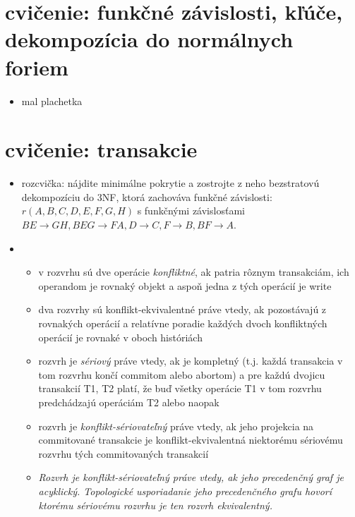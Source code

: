 \documentclass[10pt, a4paper]{article}
\begin{document}
\section{cvičenie: funkčné závislosti, kľúče, dekompozícia do normálnych foriem}

\begin{itemize}

\item mal plachetka
\end{itemize}

\newpage

\section{cvičenie: transakcie}

\begin{itemize}
\item rozcvička: nájdite minimálne pokrytie a zostrojte z neho bezstratovú dekompozíciu do 3NF, ktorá zachováva funkčné závislosti:\\
$r(A, B, C, D, E, F, G, H)$ s funkčnými závislosťami $BE\to GH, BEG\to FA, D\to C, F\to B, BF\to A$.

\item
\begin{itemize}
    \item v rozvrhu sú dve operácie \emph{konfliktné}, ak patria rôznym
    transakciám, ich operandom je rovnaký objekt a aspoň jedna z
    tých operácií je write

    \item dva rozvrhy sú konflikt-ekvivalentné práve vtedy, ak
    pozostávajú z rovnakých operácií a
    relatívne poradie každých dvoch konfliktných operácií je rovnaké
    v oboch históriách

    \item rozvrh je \emph{sériový} práve vtedy, ak je kompletný (t.j.
    každá transakcia v tom rozvrhu končí commitom alebo abortom) a
    pre každú dvojicu transakcií T1, T2 platí, že buď všetky operácie
    T1 v tom rozvrhu predchádzajú operáciám T2 alebo naopak

    \item rozvrh je \emph{konflikt-sériovateľný} práve vtedy, ak jeho
    projekcia na commitované transakcie je konflikt-ekvivalentná
    niektorému sériovému rozvrhu tých commitovaných transakcií

    \item {\sl Rozvrh je konflikt-sériovateľný práve vtedy, ak jeho
    precedenčný graf je acyklický. Topologické
    usporiadanie jeho precedenčného grafu hovorí ktorému
    sériovému rozvrhu je ten rozvrh ekvivalentný.}
\end{itemize}


\end{itemize}
\end{document}
